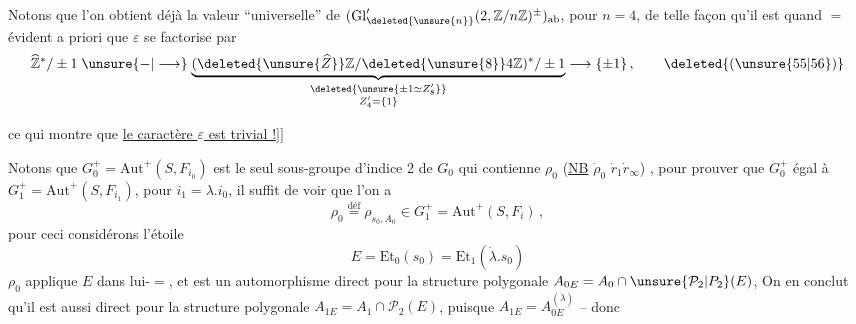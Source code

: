 
Notons que l'on obtient déjà la valeur ``universelle'' de $(\mathrm{Gl}'_{\deleted{\unsure{n}}}(2,\mathbb Z/n\mathbb Z)^{\pm})_{\rm ab}$,  pour $n=4$, de telle façon qu'il est quand $=$ évident a priori que $\varepsilon$ se factorise par
\[
\widehat{\mathbb Z}^{*}/\pm1\mathrel{\unsure{-|\longrightarrow}}
\underbrace{(\deleted{\unsure{\widehat Z}}\mathbb Z/\deleted{\unsure{8}}4\mathbb Z)^{*}/\pm1}_{\substack{\deleted{\unsure{\pm1\simeq Z'_8}}\\Z'_4=\{1\}}}
\longrightarrow\{\pm1\}\,,
\tag*{\deleted{(\unsure{55|56})}}
\]

ce qui montre que \uline{le caractère $\varepsilon$ est trivial !}$]\!]$

 Notons que  $G_0^+=\mathrm{Aut}^+(S,F_{i_0})$ est le seul sous-groupe d'indice 2 de $G_0$ qui contienne $\rho_0$ (\uline{NB} $\dot\rho_0$  $\dot r_1\dot r_\infty$) , pour prouver que  $G_0^+$ égal à $G_1^+=\mathrm{Aut}^+(S,F_{i_1})$, pour $i_1=\lambda.i_0$, il suffit de voir que l'on a
\[
\rho_0\overset{\mathrm{déf}}{=}\rho_{s_0,A_0}\in G_1^+=\mathrm{Aut}^+(S,F_i)\,,
\tag*{(55)}
\]
pour ceci considérons l'étoile
\[
E=\mathrm{Et}_0(s_0)=\mathrm{Et}_1(\dot\lambda.s_0)
\]
$\rho_0$ applique $E$ dans lui-$=$, et est un automorphisme direct  pour la structure polygonale $A_{0E}=A_0\cap\unsure{\mathcal P_2|P_2}(E)$,  On en conclut qu'il est aussi direct pour la structure polygonale $A_{1E}=A_1\cap\mathcal P_2(E)$, puisque $A_{1E}=A_{0E}^{(\dot\lambda)}$ -- donc
